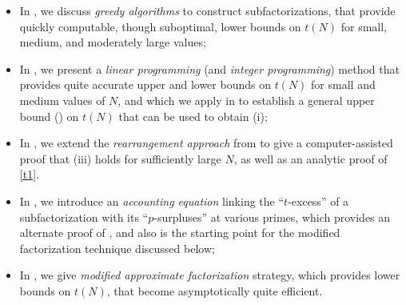 \documentclass[12pt,a4paper,reqno]{amsart}
\numberwithin{equation}{section}
\theoremstyle{plain}
\theoremstyle{definition}
\begin{document}
\begin{itemize}
  \item In , we discuss \emph{greedy algorithms} to construct subfactorizations, that provide quickly computable, though suboptimal, lower bounds on $t(N)$ for small, medium, and moderately large values;
  \item In , we present a \emph{linear programming} (and \emph{integer programming}) method that provides quite accurate upper and lower bounds on $t(N)$ for small and medium values of $N$, and which we apply in  to establish a general upper bound () on $t(N)$ that can be used to obtain (i);
  \item In , we extend the \emph{rearrangement approach} from \cite{guy-selfridge} to give a computer-assisted proof that (iii) holds for sufficiently large $N$, as well as an analytic proof of \eqref{t1}.
  \item In , we introduce an \emph{accounting equation} linking the ``$t$-excess'' of a subfactorization with its ``$p$-surpluses'' at various primes, which provides an alternate proof of , and also is the starting point for the modified factorization technique discussed below;
  \item In , we give \emph{modified approximate factorization} strategy, which provides lower bounds on $t(N)$, that become asymptotically quite efficient.
\end{itemize}
\end{document}
